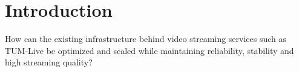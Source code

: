 
\chapter{Introduction}\label{chapter:introduction}

How can the existing infrastructure behind video streaming services such as TUM-Live be optimized and scaled while maintaining reliability, stability and high streaming quality?
